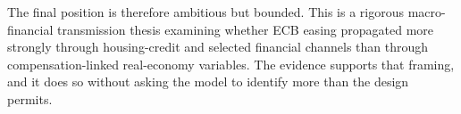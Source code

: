 The final position is therefore ambitious but bounded. This is a rigorous macro-financial transmission thesis examining whether ECB easing propagated more strongly through housing-credit and selected financial channels than through compensation-linked real-economy variables. The evidence supports that framing, and it does so without asking the model to identify more than the design permits.
